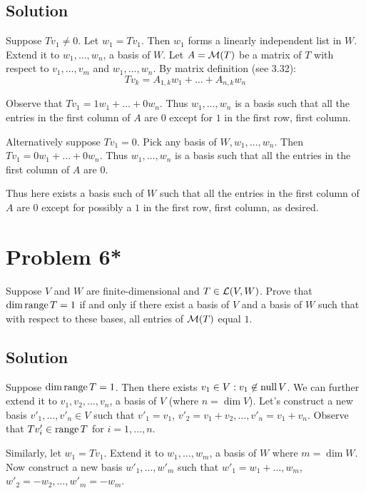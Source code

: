 \documentclass{article}
\begin{document}
\subsection*{Solution}
Suppose $Tv_1\neq0$. Let $w_1=Tv_1$. Then $w_1$ forms a linearly independent list in $W$. Extend it to $w_1,\ldots,w_n$, a basis of $W$. Let $A=\M(T)$ be a matrix of $T$ with respect to $v_1,\ldots,v_m$ and $w_1,\ldots,w_n$. By matrix definition (see 3.32):
\[Tv_k=A_{1,k}w_1+\ldots+A_{n,k}w_n\]

Observe that $Tv_1=1w_1+\ldots+0w_n$. Thus $w_1,\ldots,w_n$ is a basis such that all the entries in the first column of $A$ are $0$ except for $1$ in the first row, first column.

\vs

Alternatively suppose $Tv_1=0$. Pick any basis of $W, w_1,\ldots,w_n$. Then $Tv_1=0w_1+\ldots+0w_n$. Thus $w_1,\ldots,w_n$ is a basis such that all the entries in the first column of $A$ are $0$.

\vs

Thus here exists a basis such of $W$ such that all the entries in the first column of $A$ are $0$ except for possibly a $1$ in the first row, first column, as desired.

\section*{Problem 6*}
Suppose $V$ and $W$ are finite-dimensional and $T\in\L(V,W)$. Prove that $\dim\text{range}\, T=1$ if and only if there exist a basis of $V$ and a basis of $W$ such that with respect to these bases, all entries of $\M(T)$ equal $1$.

\subsection*{Solution}

Suppose $\dim\text{range}\, T=1$. Then there exists $v_1\in V:v_1\not\in\text{null}\, V$. We can further extend it to $v_1, v_2,\ldots,v_n$, a basis of $V$ (where $n=\dim V$). Let's construct a new basis $v'_1,\ldots,v'_n\in V$ such that $v'_1=v_1$, $v'_2=v_1+v_2, \ldots, v'_n=v_1+v_n$. Observe that $Tv'_i\in\text{range}\, T$ for $i=1,\ldots,n$.

\vs

Similarly, let $w_1=Tv_1$. Extend it to $w_1,\ldots,w_m$, a basis of $W$ where $m=\dim W$. Now construct a new basis $w'_1,\ldots,w'_m$ such that $w'_1=w_1+\ldots,w_m$, $w'_2=-w_2,\ldots, w'_m=-w_m$.

\vs
\end{document}
